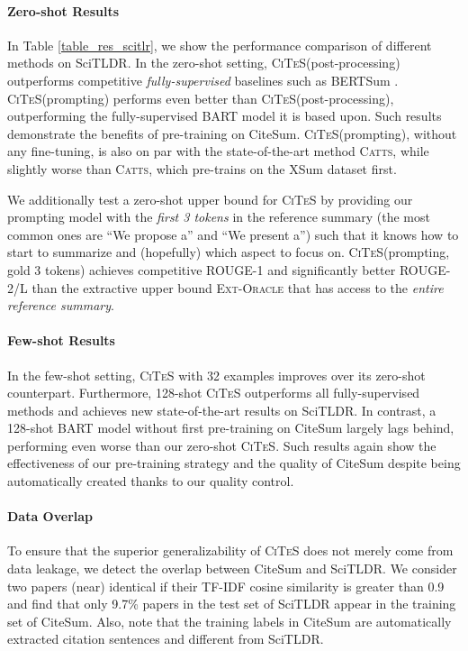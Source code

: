 \documentclass[11pt]{article}
\newcommand{\Catts}{\textsc{Catts}\xspace}
\newcommand{\Cattsxsum}{\textsc{Catts}\xspace}
\newcommand{\ours}{\textsc{CiTeS}\xspace}
\newcommand{\ourdata}{CiteSum\xspace}
\begin{document}
\paragraph{Zero-shot Results}

In Table \ref{table_res_scitlr}, we show the performance comparison of different methods on SciTLDR.
In the zero-shot setting, \ours (post-processing) outperforms competitive\textit{ fully-supervised} baselines such as BERTSum \cite{liu-lapata-2019-text}.
\ours (prompting) performs even better than \ours (post-processing), outperforming the fully-supervised BART model it is based upon.
Such results demonstrate the benefits of pre-training on \ourdata.
\ours (prompting), without any fine-tuning, is also on par with the state-of-the-art method \Catts \cite{cachola-etal-2020-tldr}, while slightly worse than \Cattsxsum, which pre-trains on the XSum dataset \cite{narayan-etal-2018-dont} first.

We additionally test a zero-shot upper bound for \ours by providing our prompting model with the \textit{first 3 tokens} in the reference summary (the most common ones are ``We propose a'' and ``We present a'') such that it knows how to start to summarize and (hopefully) which aspect to focus on.
\ours (prompting, gold 3 tokens) achieves competitive ROUGE-1 and significantly better ROUGE-2/L than the extractive upper bound \textsc{Ext-Oracle} that has access to the \textit{entire reference summary}.

\paragraph{Few-shot Results}
In the few-shot setting, \ours with 32 examples improves over its zero-shot counterpart.
Furthermore, 128-shot \ours outperforms all fully-supervised methods and achieves new state-of-the-art results on SciTLDR.
In contrast, a 128-shot BART model without first pre-training on \ourdata largely lags behind, performing even worse than our zero-shot \ours.
Such results again show the effectiveness of our pre-training strategy and the quality of \ourdata despite being automatically created thanks to our quality control.

\paragraph{Data Overlap}
To ensure that the superior generalizability of \ours does not merely come from data leakage, we detect the overlap between \ourdata and SciTLDR.
We consider two papers (near) identical if their TF-IDF cosine similarity is greater than 0.9 and find that only 9.7\% papers in the test set of SciTLDR appear in the training set of \ourdata. Also, note that the training labels in \ourdata are automatically extracted citation sentences and different from SciTLDR.
\end{document}
